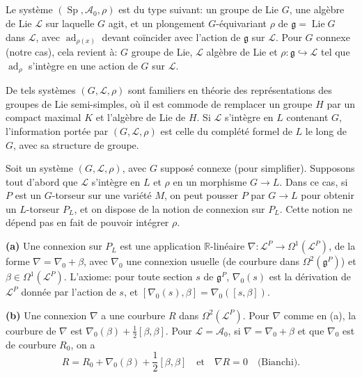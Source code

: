 \documentclass[11pt,a4paper]{article}
\theoremstyle{plain}
\theoremstyle{definition}
\DeclareMathOperator{\ad}{ad}
\DeclareMathOperator{\Lie}{Lie}
\DeclareMathOperator{\Sp}{Sp}
\newcommand{\R}{\mathbb{R}}
\begin{document}
\subsection{}
Le syst\`eme $(\Sp, \mathcal{A}_{0}, \rho)$ est du type suivant: un groupe de Lie $G$, une alg\`ebre de Lie $\mathcal{L}$ sur laquelle $G$ agit, et un plongement $G$-\'equivariant $\rho$ de $\mathfrak{g} = \Lie G$ dans $\mathcal{L}$, avec $\ad_{\rho(x)}$ devant co\"incider avec l'action de $\mathfrak{g}$ sur $\mathcal{L}$. Pour $G$ connexe (notre cas), cela revient \`a: $G$ groupe de Lie, $\mathcal{L}$ alg\`ebre de Lie et $\rho: \mathfrak{g} \hookrightarrow \mathcal{L}$ tel que $\ad_{\rho}$ s'int\`egre en une action de $G$ sur $\mathcal{L}$.

De tels syst\`emes $(G, \mathcal{L}, \rho)$ sont familiers en th\'eorie des repr\'esentations des groupes de Lie semi-simples, o\`u il est commode de remplacer un groupe $H$ par un compact maximal $K$ et l'alg\`ebre de Lie de $H$. Si $\mathcal{L}$ s'int\`egre en $L$ contenant $G$,
l'information port\'ee par $(G, \mathcal{L}, \rho)$ est celle du compl\'et\'e formel de $L$ le long de $G$,
avec sa structure de groupe.

Soit un syst\`eme $(G, \mathcal{L}, \rho)$, avec $G$ suppos\'e connexe (pour simplifier). Supposons
tout d'abord que $\mathcal{L}$ s'int\`egre en $L$ et $\rho$ en un morphisme $G \to L$. Dans ce cas, si $P$
est un $G$-torseur sur une vari\'et\'e $M$, on peut pousser $P$ par $G \to L$ pour obtenir un
$L$-torseur $P_{L}$, et on dispose de la notion de connexion sur $P_{L}$. Cette notion ne d\'epend pas en fait de pouvoir int\'egrer $\rho$.

\textbf{(a)} Une connexion sur $P_{L}$ est une application $\R$-lin\'eaire $\nabla: \mathcal{L}^{P} \to \Omega^{1}(\mathcal{L}^{P})$, de la forme $\nabla = \nabla_{0} + \beta$, avec $\nabla_{0}$ une connexion usuelle (de courbure dans $\Omega^{2}(\mathfrak{g}^{P})$) et $\beta \in \Omega^{1}(\mathcal{L}^{P})$. L'axiome: pour toute section $s$ de $\mathfrak{g}^{P}$, $\nabla_{0}(s)$ est la d\'erivation de $\mathcal{L}^{P}$ donn\'ee par l'action de $s$, et $[\nabla_{0}(s), \beta] = \nabla_{0}([s, \beta])$.

\textbf{(b)} Une connexion $\nabla$ a une courbure $R$ dans $\Omega^{2}(\mathcal{L}^{P})$. Pour $\nabla$ comme en (a), la courbure de $\nabla$ est $\nabla_{0}(\beta) + \frac{1}{2}[\beta,\beta]$. Pour $\mathcal{L} = \mathcal{A}_{0}$, si $\nabla = \nabla_{0} + \beta$ et que $\nabla_{0}$ est de courbure $R_{0}$, on a
\[
R = R_{0} + \nabla_{0}(\beta) + \frac{1}{2}[\beta,\beta] \quad \text{et} \quad \nabla R = 0 \quad \text{(Bianchi)}.
\]
\end{document}
